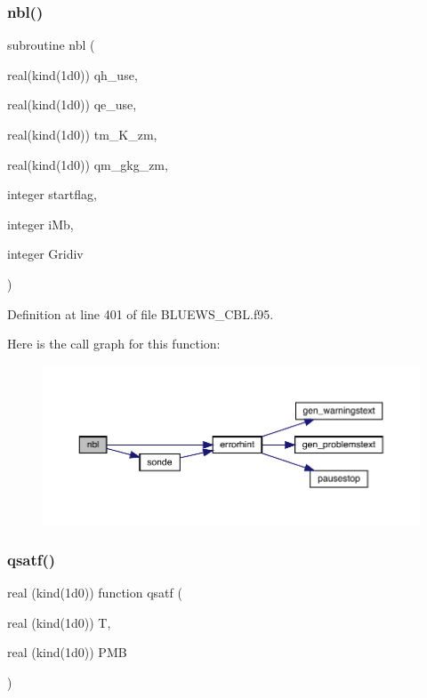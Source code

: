 \subsubsection{\texorpdfstring{nbl()}{nbl()}}
{\footnotesize\ttfamily subroutine nbl (\begin{DoxyParamCaption}\item[{real(kind(1d0))}]{qh\+\_\+use,  }\item[{real(kind(1d0))}]{qe\+\_\+use,  }\item[{real(kind(1d0))}]{tm\+\_\+\+K\+\_\+zm,  }\item[{real(kind(1d0))}]{qm\+\_\+gkg\+\_\+zm,  }\item[{integer}]{startflag,  }\item[{integer}]{i\+Mb,  }\item[{integer}]{Gridiv }\end{DoxyParamCaption})}



Definition at line 401 of file B\+L\+U\+E\+W\+S\+\_\+\+C\+B\+L.\+f95.

Here is the call graph for this function\+:\nopagebreak
\begin{figure}[H]
\begin{center}
\leavevmode
\includegraphics[width=350pt]{_b_l_u_e_w_s___c_b_l_8f95_ada6e5e5cd6b578659b196bb8c26bd98c_cgraph}
\end{center}
\end{figure}
\mbox{\label{_b_l_u_e_w_s___c_b_l_8f95_a67036afb2f40fef682aefc6df6d0c311}} 
\subsubsection{\texorpdfstring{qsatf()}{qsatf()}}
{\footnotesize\ttfamily real (kind(1d0)) function qsatf (\begin{DoxyParamCaption}\item[{real (kind(1d0))}]{T,  }\item[{real (kind(1d0))}]{P\+MB }\end{DoxyParamCaption})}



